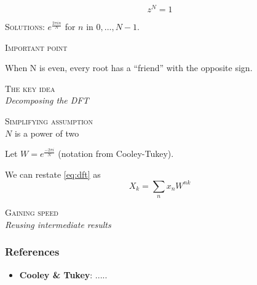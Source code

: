 \documentclass[14pt]{beamer}
\begin{document}
\begin{frame}
    \begin{equation*}
        z^N = 1
    \end{equation*}

    \begin{figure}
        \centering
        
    \end{figure}
    \centering

    \textsc{Solutions}: $e^\frac {2\pi i n}{N}$ for $n$ in $0, \dots, N-1$.
\end{frame}


\begin{frame}
    \centering
    \textsc{Important point}
    \begin{figure}
        \centering
        
    \end{figure}
    When N is even, every root has a ``friend'' with the opposite sign.
\end{frame}


\begin{frame}
    \centering
    \textsc{\large The key idea}\\
    \textit{\scriptsize Decomposing the DFT}
\end{frame}

\begin{frame}
    \begin{center}
        \textsc{Simplifying assumption}\\[.5em]
        $N$ is a power of two\\[1.5em]
    \end{center}
\end{frame}

\begin{frame}
    Let $W = e^\frac{-2 \pi i} N$ (notation from Cooley-Tukey).

    We can restate \eqref{eq:dft} as
    \begin{equation}
        X_k = \sum_n x_n W^{nk}
    \end{equation}
\end{frame}

\begin{frame}
    \centering
    \textsc{\large Gaining speed}\\
    \textit{\scriptsize Reusing intermediate results}
\end{frame}

\begin{frame}
    \frametitle{References}

    \begin{itemize}
        \item \textbf{Cooley \& Tukey}: .....
    \end{itemize}
\end{frame}
\end{document}
